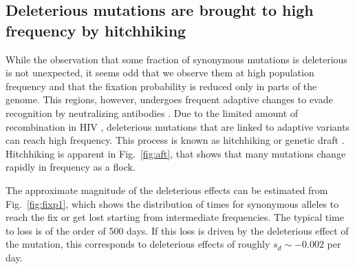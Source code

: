 \documentclass[rmp, twocolumn]{revtex4}
\newcommand{\FIG}[1]{Fig.~\ref{fig:#1}}
\begin{document}
\subsection{Deleterious mutations are brought to high frequency by hitchhiking}

While the observation that some fraction of synonymous mutations is deleterious
is not unexpected, it seems odd that we observe them at high population
frequency and that the fixation probability is reduced only in parts of the
genome. This regions, however, undergoes frequent adaptive changes to evade
recognition by neutralizing antibodies \cite{williamson_adaptation_2003,
richman_rapid_2003}. Due to the limited amount of recombination in HIV
\cite{neher_recombination_2010, batorsky_estimate_2011}, deleterious mutations
that are linked to adaptive variants can reach high frequency. This process is
known as hitchhiking \citep{smith_hitch-hiking_1974} or genetic draft
\citep{gillespie_genetic_2000,neher_genetic_2011}. Hitchhiking is  apparent in
\FIG{aft}, that shows that many mutations change rapidly in frequency as a
flock. 

The approximate magnitude of the deleterious effects can be estimated from
\FIG{fixp1}, which shows the distribution of times for synonymous
alleles to reach the fix or get lost starting from intermediate frequencies. The
typical time to loss is of the order of 500 days. If this loss is driven by the
deleterious effect of the mutation, this corresponds to deleterious effects of
roughly $s_d \sim - 0.002$ per day.
\end{document}
